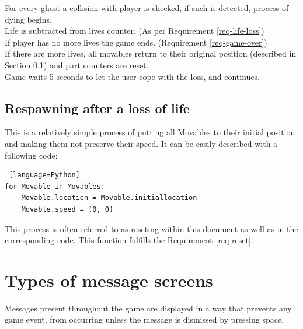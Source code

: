 \documentclass[11pt,a4paper]{report}
\newcommand{\dsubsection}[1]{\FloatBarrier \subsection{#1}}
\begin{document}
				For every ghost a collision with player is checked, if such is detected, process of dying begins.\\
				Life is subtracted from lives counter. (As per Requirement \ref{req-life-loss})\\
				If player has no more lives the game ends. (Requirement \ref{req-game-over})\\
				If there are more lives, all movables return to their original position (described in Section \ref{respawning})
				and part counters are reset.\\
				Game waits 5 seconds to let the user cope with the loss, and continues.
			\dsubsection{Respawning after a loss of life}
				\label{respawning}
				This is a relatively simple process of putting all Movables to their initial position and making them not preserve their speed. It can be easily described with a following code:
				\begin{lstlisting} [language=Python]
for Movable in Movables:
    Movable.location = Movable.initiallocation
    Movable.speed = (0, 0)
				\end{lstlisting}
				This process is often referred to as reseting within this document as well as in the corresponding code. This function fulfills the Requirement \ref{req-reset}.
		\section{Types of message screens}
			\label{typesofscreens}
			Messages present throughout the game are displayed in a way that prevents any game event, from occurring unless the message is dismissed by pressing space.
			
\end{document}
